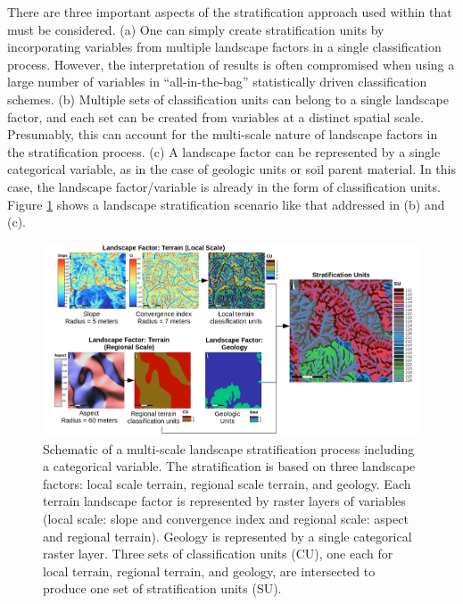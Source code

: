 There are three important aspects of the stratification approach used within
 that must be considered. (a) One can simply create stratification
units by incorporating variables from multiple landscape factors in a single
classification process. However, the interpretation of results is often
compromised when using a large number of variables in ``all-in-the-bag''
statistically driven classification schemes. (b) Multiple sets of classification
units can belong to a single landscape factor, and each set can be created from
variables at a distinct spatial scale. Presumably, this can account for the
multi-scale nature of landscape factors in the stratification process. (c) A
landscape factor can be represented by a single categorical variable, as in the
case of geologic units or soil parent material. In this case, the landscape
factor/variable is already in the form of classification units. Figure
\ref{fig:f3} shows a landscape stratification scenario like that addressed in
(b) and (c).

\begin{figure}[H]

{\centering \includegraphics[width=0.9\linewidth,height=0.25\textheight]{figures/figure_3} 

}

\caption{Schematic of a multi-scale landscape stratification process including a categorical variable. The stratification is based on three landscape factors: local scale terrain, regional scale terrain, and geology. Each terrain landscape factor is represented by raster layers of variables (local scale: slope and convergence index and regional scale: aspect and regional terrain). Geology is represented by a single categorical raster layer. Three sets of classification units (CU), one each for local terrain, regional terrain, and geology, are intersected to produce one set of stratification units (SU).}\label{fig:f3}
\end{figure}

